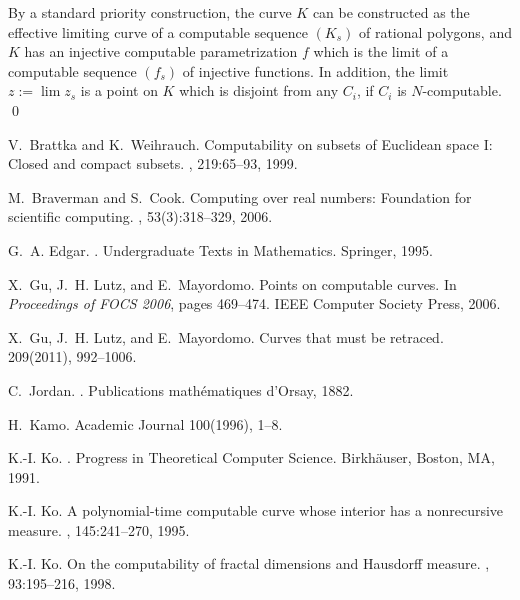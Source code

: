 \documentclass{LMCS}
\theoremstyle{plain}
\begin{document}
By a standard priority construction, the curve $K$ can be constructed as the effective limiting curve of a computable sequence $(K_s)$ of rational polygons, and $K$ has an injective computable parametrization $f$ which is the limit of a computable sequence $(f_s)$ of injective functions. In addition, the limit $z:= \lim z_s$ is a point on $K$ which is disjoint from any $C_i$, if $C_i$ is $N$-computable.
\qed


\begin{thebibliography}{10}

V.~Brattka and K.~Weihrauch.
\newblock Computability on subsets of {E}uclidean space {I}: Closed and compact
  subsets.
, 219:65--93, 1999.

M.~Braverman and S.~Cook.
\newblock Computing over real numbers: Foundation for scientific computing.
, 53(3):318--329, 2006.

G.~A. Edgar.
.
\newblock Undergraduate Texts in Mathematics. Springer, 1995.

X.~Gu, J.~H. Lutz, and E.~Mayordomo.
\newblock Points on computable curves.
\newblock In {\em Proceedings of FOCS 2006}, pages 469--474. IEEE Computer
  Society Press, 2006.

X.~Gu, J.~H. Lutz, and E.~Mayordomo.
\newblock Curves that must be retraced.
 209(2011), 992--1006.


C.~Jordan.
.
\newblock Publications math{\'e}matiques d'Orsay, 1882.

H.~Kamo.
\newblock Academic Journal 100(1996), 1--8.

K.-I. Ko.
.
\newblock Progress in Theoretical Computer Science. Birkh{\"a}user, Boston, MA,
  1991.

K.-I. Ko.
\newblock A polynomial-time computable curve whose interior has a nonrecursive
  measure.
, 145:241--270, 1995.

K.-I. Ko.
\newblock On the computability of fractal dimensions and Hausdorff measure.
, 93:195--216, 1998.


\end{thebibliography}
\end{document}
